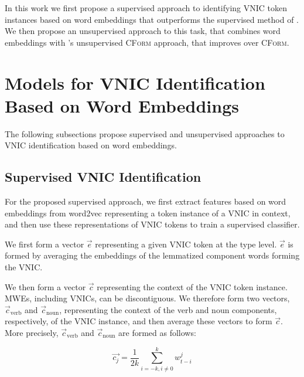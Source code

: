 \documentclass[11pt]{article}
\newcommand{\posciteauthor}[1]{\citeauthor{#1}'s}
\newcommand{\cform}{\textsc{CForm}\xspace}
\newcommand{\VNIC}{VNIC\xspace}
\newcommand{\VNICs}{VNICs\xspace}
\begin{document}
In this work we first propose a supervised approach to identifying
\VNIC token instances based on word embeddings that outperforms the
supervised method of \cite{Fazly2009}. We then propose an unsupervised
approach to this task, that combines word embeddings with
\posciteauthor{Fazly2009} unsupervised \cform approach, that improves
over \cform.


\section{Models for \VNIC Identification Based on Word Embeddings\label{sec:method}}

The following subsections propose supervised and unsupervised
approaches to \VNIC identification based on word embeddings.

\subsection{Supervised VNIC Identification\label{sec:method:sup}}

For the proposed supervised approach, we first extract features based
on word embeddings from word2vec representing a token instance of a
\VNIC in context, and then use these representations of \VNIC tokens to
train a supervised classifier.


We first form a vector $\vec{e}$ representing a given \VNIC token at
the type level. $\vec{e}$ is formed by averaging the embeddings of the
lemmatized component words forming the \VNIC.

We then form a vector $\vec{c}$ representing the context of the \VNIC
token instance. MWEs, including \VNICs, can be discontiguous. We
therefore form two vectors, $\vec{c}_\mathrm{verb}$ and
$\vec{c}_\mathrm{noun}$, representing the context of the verb and noun
components, respectively, of the \VNIC instance, and then average
these vectors to form $\vec{c}$. More precisely,
$\vec{c}_\mathrm{verb}$ and $\vec{c}_\mathrm{noun}$ are formed as
follows:



\begin{equation}
\vec{c_j} = \frac{1}{2k} \sum_{i=-k, i \neq 0}^{k} w^j_{t-i}
\end{equation}
\end{document}
